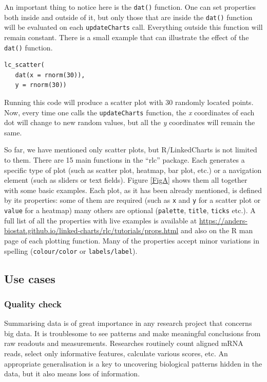 \documentclass[twocolumn,10pt]{article}
\begin{document}
An important thing to notice here is the \texttt{dat()} function. One can set properties both inside and outside of it, but only those that are inside the \texttt{dat()} function will be evaluated on each \texttt{updateCharts} call. Everything outside this function will remain constant. There is a small example that can illustrate the effect of the \texttt{dat()} function.

\begin{verbatim}
lc_scatter(
   dat(x = rnorm(30)),
   y = rnorm(30))
\end{verbatim}

Running this code will produce a scatter plot with 30 randomly located points. Now, every time one calls the \texttt{updateCharts} function, the \emph{x} coordinates of each dot will change to new random values, but all the \emph{y} coordinates will remain the same.

So far, we have mentioned only scatter plots, but R/LinkedCharts is not limited to them. There are 15 main functions in the ``rlc'' package. Each generates a specific type of plot (such as scatter plot, heatmap, bar plot, etc.) or a navigation element (such as sliders or text fields). Figure \ref{FigA} shows them all together with some basic examples. Each plot, as it has been already mentioned, is defined by its properties: some of them are required (such as \texttt{x} and \texttt{y} for a scatter plot or \texttt{value} for a heatmap) many others are optional (\texttt{palette}, \texttt{title}, \texttt{ticks} etc.). A full list of all the properties with live examples is available at \url{https://anders-biostat.github.io/linked-charts/rlc/tutorials/props.html} and also on the R man page of each plotting function. Many of the properties accept minor variations in spelling (\texttt{colour/color} or \texttt{labels/label}).

\subsection{Use cases}
\subsubsection{Quality check}

Summarising data is of great importance in any research project that concerns big data. It is troublesome to see patterns and make meaningful conclusions from raw readouts and measurements. Researches routinely count aligned mRNA reads, select only informative features, calculate various scores, etc. An appropriate generalisation is a key to uncovering biological patterns hidden in the data, but it also means loss of information.
\end{document}
